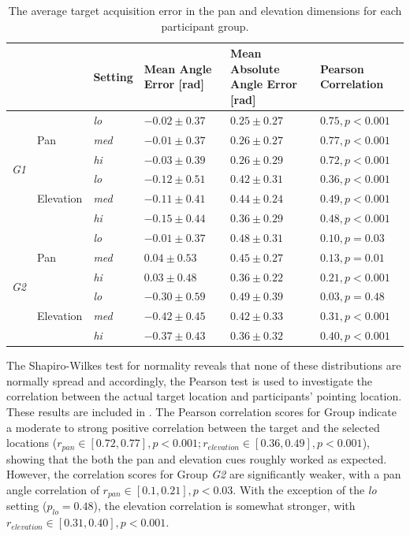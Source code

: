 \documentclass[]{interact}
\begin{document}
\begin{table}
  \centering
  \caption{The average target acquisition error in the pan and elevation dimensions for each participant group. }\label{tab:target-results}
  \begin{tabular}{p{0.5cm}p{1.3cm}p{0.9cm}p{2cm}p{2cm}p{2.25cm}}
    \toprule
    &           & Setting      & Mean Angle Error [rad] & Mean Absolute Angle Error [rad] &  Pearson Correlation \\ \midrule
    \multirow{6}{*}{\textit{G1}}
    &           & \textit{lo}  & $-0.02\pm0.37$ & $0.25\pm0.27$ & $0.75, p < 0.001$ \\
    & Pan       & \textit{med} & $-0.01\pm0.37$ & $0.26\pm0.27$ & $0.77, p < 0.001$ \\
    &           & \textit{hi}  & $-0.03\pm0.39$ & $0.26\pm0.29$ & $0.72, p < 0.001$ \\ \cline{2-6}
    &           & \textit{lo}  & $-0.12\pm0.51$ & $0.42\pm0.31$ & $0.36, p < 0.001$ \\
    & Elevation & \textit{med} & $-0.11\pm0.41$ & $0.44\pm0.24$ & $0.49, p < 0.001$ \\
    &           & \textit{hi}  & $-0.15\pm0.44$ & $0.36\pm0.29$ & $0.48, p < 0.001$ \\ \midrule
    \multirow{6}{*}{\textit{G2}}
    &           & \textit{lo}  & $-0.01\pm0.37$ & $0.48\pm0.31$ & $0.10, p = 0.03$  \\
    & Pan       & \textit{med} & $ 0.04\pm0.53$ & $0.45\pm0.27$ & $0.13, p = 0.01$  \\
    &           & \textit{hi}  & $ 0.03\pm0.48$ & $0.36\pm0.22$ & $0.21, p < 0.001$ \\\cline{2-6}
    &           & \textit{lo}  & $-0.30\pm0.59$ & $0.49\pm0.39$ & $0.03, p = 0.48$  \\
    & Elevation & \textit{med} & $-0.42\pm0.45$ & $0.42\pm0.33$ & $0.31, p < 0.001$ \\
    &           & \textit{hi}  & $-0.37\pm0.43$ & $0.36\pm0.32$ & $0.40, p < 0.001$ \\ 
    \bottomrule
  \end{tabular}
\end{table}

The Shapiro-Wilkes test for normality reveals that none of these distributions are normally spread and accordingly, the Pearson test is used to investigate the correlation between the actual target location and participants' pointing location.
These results are included in .
The Pearson correlation scores for Group  indicate a moderate to strong positive correlation between the target and the selected locations ($r_{pan} \in [0.72, 0.77], p < 0.001; r_{elevation} \in [0.36, 0.49], p < 0.001$), showing that the both the pan and elevation cues roughly worked as expected.
However, the correlation scores for Group \textit{G2} are significantly weaker, with a pan angle correlation of $r_{pan} \in [0.1, 0.21], p < 0.03$.
With the exception of the \textit{lo} setting ($p_{lo} = 0.48$), the elevation correlation is somewhat stronger, with $r_{elevation} \in [0.31, 0.40], p < 0.001$.
\end{document}
